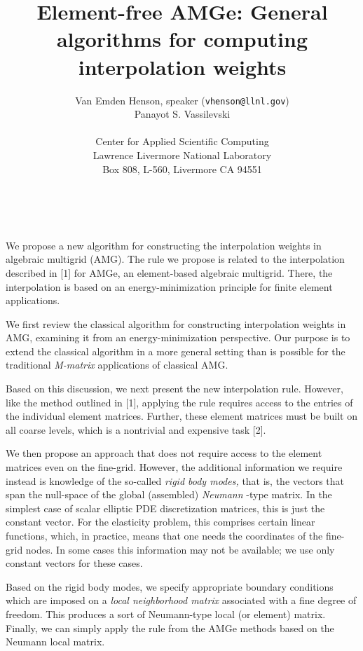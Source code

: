 \documentclass{article}
\date{ ~ \hspace{-4mm}}
\title{Element-free AMGe: General algorithms for computing interpolation weights  }
\author{Van Emden Henson, speaker ({\tt vhenson@llnl.gov}) \\ Panayot S. Vassilevski \\ \\ Center for Applied Scientific Computing \\ Lawrence Livermore National Laboratory \\ Box 808, L-560, Livermore CA 94551}
\begin{document}
\maketitle
\thispagestyle{empty}





We propose a new algorithm for constructing the interpolation weights
in algebraic multigrid (AMG). The rule we propose is related to the interpolation
described in [1] for AMGe, an element-based algebraic multigrid. There,
the interpolation is based on an energy-minimization principle for finite
element applications.



We first review the classical algorithm for constructing interpolation
weights in AMG, examining it from an energy-minimization perspective. Our
purpose is to extend the classical algorithm in a more general setting
than is possible for the traditional
{\em 
M-matrix
}
applications of classical
AMG.



Based on this discussion, we next present the new interpolation rule.
However, like the method outlined in [1], applying the rule requires access
to the entries of the individual element matrices. Further, these element
matrices must be built on all coarse levels, which is a nontrivial and
expensive task [2].



We then propose an approach that does not require access to the element
matrices even on the fine-grid. However, the additional information we
require instead is knowledge of the so-called
{\em 
rigid body modes,
}
that is, the vectors that span the null-space of the global (assembled)
{\em 
Neumann
}
-type
matrix. In the simplest case of scalar elliptic PDE discretization matrices,
this is just the constant vector. For the elasticity problem, this comprises
certain linear functions, which, in practice, means that one needs the
coordinates of the fine-grid nodes. In some cases this information may
not be available; we use only constant vectors for these cases.



Based on the rigid body modes, we specify appropriate boundary conditions
which are imposed on a
{\em 
local neighborhood matrix
}
associated with
a fine degree of freedom. This produces a sort of Neumann-type local (or
element) matrix. Finally, we can simply apply the rule from the AMGe methods
based on the Neumann local matrix.
\end{document}
